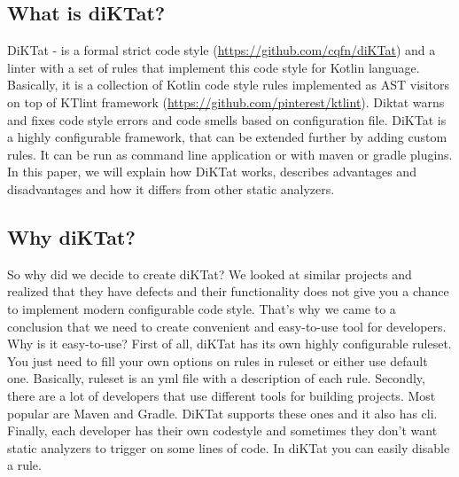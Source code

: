 \subsection{What is diKTat?}
DiKTat - is a formal strict code style (\url{https://github.com/cqfn/diKTat}) and a linter with a set of rules that implement this code style for Kotlin language. Basically, it is a collection of Kotlin code style rules implemented as AST visitors on top of KTlint framework (\url{https://github.com/pinterest/ktlint}). Diktat warns and fixes code style errors and code smells based on configuration file. DiKTat is a highly configurable framework, that can be extended further by adding custom rules. It can be run as command line application or with maven or gradle plugins. In this paper, we will explain how DiKTat works, describes advantages and disadvantages and how it differs from other static analyzers.

\subsection{Why diKTat?}
So why did we decide to create diKTat? We looked at similar projects and realized that they have defects and their functionality does not give you a chance to implement modern configurable code style. That’s why we came to a conclusion that we need to create convenient and easy-to-use tool for developers. Why is it easy-to-use? First of all, diKTat has its own highly configurable ruleset. You just need to fill your own options on rules in ruleset or either use default one. Basically, ruleset is an yml file with a description of each rule. Secondly, there are a lot of developers that use different tools for building projects. Most popular are Maven and Gradle. DiKTat supports these ones and it also has cli. Finally, each developer has their own codestyle and sometimes they don’t want static analyzers to trigger on some lines of code. In diKTat you can easily disable a rule.